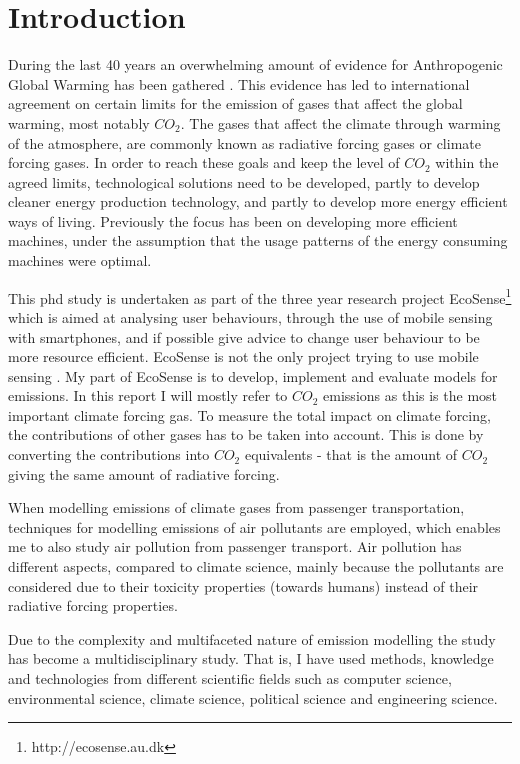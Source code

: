 \section{Introduction}
During the last 40 years an overwhelming amount of evidence for Anthropogenic Global Warming has been gathered \cite{schipper2008earthscan}. This evidence has led to international agreement on certain limits for the emission of gases that affect the global warming, most notably $CO_2$.  The gases that affect the climate through warming of the atmosphere, are commonly known as radiative forcing gases or climate forcing gases. In order to reach these goals and keep the level of $CO_2$ within the agreed limits, technological solutions need to be developed, partly to develop cleaner energy production technology, and partly to develop more energy efficient ways of living. Previously the focus has been on developing more efficient machines, under the assumption that the usage patterns of the energy consuming machines were optimal.

This phd study is undertaken as part of the three year research project EcoSense\footnote{http://ecosense.au.dk} which is aimed at analysing user behaviours, through the use of mobile sensing with smartphones, and if possible give advice to change user behaviour to be more resource efficient. 
EcoSense is not the only project trying to use mobile sensing \cite{mun_peir_2009} \cite{calabrese1977}. My part of EcoSense is to develop,  implement and evaluate models for emissions. In this report I will mostly refer to $CO_2$ emissions as this is the most important climate forcing gas. To measure the total impact on climate forcing, the contributions of other gases has to be taken into account. This is done by converting the contributions into $CO_2$ equivalents - that is the amount of $CO_2$ giving the same amount of radiative forcing.

When modelling emissions of climate gases from passenger transportation, techniques for modelling emissions of air pollutants are employed, which enables me to also study air pollution from passenger transport. Air pollution has different aspects, compared to climate science, mainly because the pollutants are considered due to their toxicity properties (towards humans) instead of their radiative forcing properties.

Due to the complexity and multifaceted nature of emission modelling the study has become a multidisciplinary study. That is, I have used methods, knowledge and technologies from different scientific fields such as computer science, environmental science, climate science, political science and engineering science.

